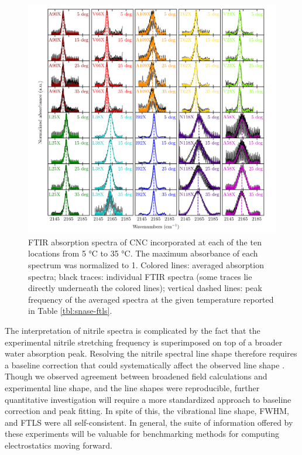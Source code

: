 \begin{figure}
    \center
    \includegraphics[width=\double]{figures-snase/ftls_all_spectra.png}
    \caption[Temperature dependent FTIR of CNC at each location]{
        FTIR absorption spectra of CNC incorporated at each of the ten locations from 5 \si{\celsius} to 35 \si{\celsius}. 
        The maximum absorbance of each spectrum was normalized to 1. 
        Colored lines: averaged absorption spectra; 
        black traces: individual FTIR spectra (some traces lie directly underneath the colored lines); 
        vertical dashed lines: peak frequency of the averaged spectra at the given temperature reported in Table \ref{tbl:snase-ftls}.
    }
    \label{fig:snase-ftls_spectra}
\end{figure}

The interpretation of nitrile spectra is complicated by the fact that the experimental nitrile stretching frequency is superimposed on top of a broader water absorption peak. 
Resolving the nitrile spectral line shape therefore requires a baseline correction that could systematically affect the observed line shape \cite{vanWilderen2014}. 
Though we observed agreement between broadened field calculations and experimental line shape, and the line shapes were reproducible, further quantitative investigation will require a more standardized approach to baseline correction and peak fitting. 
In spite of this, the vibrational line shape, FWHM, and FTLS were all self-consistent. 
In general, the suite of information offered by these experiments will be valuable for benchmarking methods for computing electrostatics moving forward.

